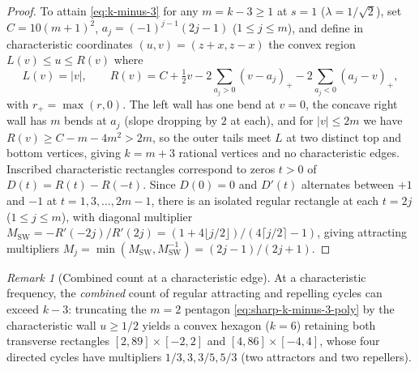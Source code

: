 \documentclass[11pt,reqno]{amsart}
\theoremstyle{definition}
\theoremstyle{remark}
\newtheorem{remark}[theorem]{Remark}
\begin{document}
\begin{proof}
To attain \eqref{eq:k-minus-3} for any $m = k-3 \ge 1$ at $s = 1$ ($\lambda = 1/\sqrt{2}$), set $C = 10(m+1)^2$, $a_j = (-1)^{j-1}(2j-1)$ ($1 \le j \le m$), and define in characteristic coordinates $(u,v) = (z+x, z-x)$ the convex region $L(v) \le u \le R(v)$ where
\begin{equation}\label{eq:sharp-k-minus-3-poly}
  L(v) = |v|, \qquad R(v) = C + \tfrac{1}{2}v - 2\sum_{a_j > 0} (v - a_j)_+ - 2\sum_{a_j < 0} (a_j - v)_+,
\end{equation}
with $r_+ = \max(r, 0)$. The left wall has one bend at $v = 0$, the concave right wall has $m$ bends at $a_j$ (slope dropping by $2$ at each), and for $|v| \le 2m$ we have $R(v) \ge C - m - 4m^2 > 2m$, so the outer tails meet $L$ at two distinct top and bottom vertices, giving $k = m + 3$ rational vertices and no characteristic edges. Inscribed characteristic rectangles correspond to zeros $t > 0$ of $D(t) = R(t) - R(-t)$. Since $D(0) = 0$ and $D'(t)$ alternates between $+1$ and $-1$ at $t = 1, 3, \dots, 2m-1$, there is an isolated regular rectangle at each $t = 2j$ ($1 \le j \le m$), with diagonal multiplier $M_{\mathrm{SW}} = -R'(-2j)/R'(2j) = (1 + 4\lfloor j/2 \rfloor)/(4\lceil j/2 \rceil - 1)$, giving attracting multipliers $M_j = \min(M_{\mathrm{SW}}, M_{\mathrm{SW}}^{-1}) = (2j-1)/(2j+1)$.
\end{proof}

\begin{remark}[Combined count at a characteristic edge]
At a characteristic frequency, the \emph{combined} count of regular attracting and repelling cycles can exceed $k-3$: truncating the $m=2$ pentagon \eqref{eq:sharp-k-minus-3-poly} by the characteristic wall $u \ge 1/2$ yields a convex hexagon ($k=6$) retaining both transverse rectangles $[2,89]\times[-2,2]$ and $[4,86]\times[-4,4]$, whose four directed cycles have multipliers $1/3, 3, 3/5, 5/3$ (two attractors and two repellers).
\end{remark}
\end{document}
